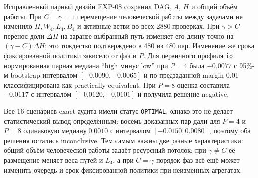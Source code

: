 Исправленный парный дизайн EXP-08 сохранил DAG, $A$, $H$ и общий объём работы.
При $C=\gamma=1$ перемещение человеческой работы между задачами не изменило
$H,W_4,L_4,B_4$ и активные ветви во всех 2880 проверках. При $\gamma>C$
перенос доли $\Delta H$ на заранее выбранный путь изменяет его длину точно на
$(\gamma-C)\Delta H$; это тождество подтверждено в 480 из 480 пар. Изменение
же срока фиксированной политики зависело от фаз и $P$. Для первичного профиля
\texttt{io} нормированная парная медиана ``high минус low'' при $P=4$ была
$-0.0077$ с 95\%-м bootstrap-интервалом $[-0.0090,-0.0065]$ и по
предзаданной margin 0.01 классифицирована как practically equivalent. При
$P=8$ оценка составила $-0.0117$ с интервалом $[-0.0120,-0.0101]$ и получила
решение negative.

Все 16 сценариев exact-аудита имели статус \texttt{OPTIMAL}, однако это не
делает статистический вывод определённым: восемь доказанных пар дали для
$P=4$ и $P=8$ одинаковую медиану $0.0010$ с интервалом
$[-0.0150,0.0080]$, поэтому оба решения остались inconclusive. Тем самым
важны две разные характеристики: общий объём человеческой работы задаёт
ресурсный потолок; при $\gamma\ne C$ её размещение меняет веса путей и $L_4$, а
при $C=\gamma$ порядок фаз всё ещё может изменить очередь и срок фиксированной
политики при неизменных агрегатах.
